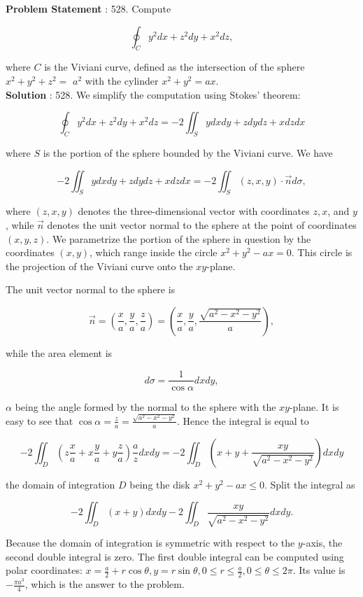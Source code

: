 \documentclass[10pt]{article}
\begin{document}
\textbf{Problem Statement} :
528. Compute

$$
\oint_{C} y^{2} d x+z^{2} d y+x^{2} d z,
$$

where $C$ is the Viviani curve, defined as the intersection of the sphere $x^{2}+y^{2}+z^{2}=$ $a^{2}$ with the cylinder $x^{2}+y^{2}=a x$.
\\
\textbf{Solution} :
528. We simplify the computation using Stokes' theorem:

$$
\oint_{C} y^{2} d x+z^{2} d y+x^{2} d z=-2 \iint_{S} y d x d y+z d y d z+x d z d x
$$

where $S$ is the portion of the sphere bounded by the Viviani curve. We have

$$
-2 \iint_{S} y d x d y+z d y d z+x d z d x=-2 \iint_{S}(z, x, y) \cdot \vec{n} d \sigma,
$$

where $(z, x, y)$ denotes the three-dimensional vector with coordinates $z, x$, and $y$, while $\vec{n}$ denotes the unit vector normal to the sphere at the point of coordinates $(x, y, z)$. We parametrize the portion of the sphere in question by the coordinates $(x, y)$, which range inside the circle $x^{2}+y^{2}-a x=0$. This circle is the projection of the Viviani curve onto the $x y$-plane.

The unit vector normal to the sphere is

$$
\vec{n}=\left(\frac{x}{a}, \frac{y}{a}, \frac{z}{a}\right)=\left(\frac{x}{a}, \frac{y}{a}, \frac{\sqrt{a^{2}-x^{2}-y^{2}}}{a}\right),
$$

while the area element is

$$
d \sigma=\frac{1}{\cos \alpha} d x d y,
$$

$\alpha$ being the angle formed by the normal to the sphere with the $x y$-plane. It is easy to see that $\cos \alpha=\frac{z}{a}=\frac{\sqrt{a^{2}-x^{2}-y^{2}}}{a}$. Hence the integral is equal to

$$
-2 \iint_{D}\left(z \frac{x}{a}+x \frac{y}{a}+y \frac{z}{a}\right) \frac{a}{z} d x d y=-2 \iint_{D}\left(x+y+\frac{x y}{\sqrt{a^{2}-x^{2}-y^{2}}}\right) d x d y
$$

the domain of integration $D$ being the disk $x^{2}+y^{2}-a x \leq 0$. Split the integral as

$$
-2 \iint_{D}(x+y) d x d y-2 \iint_{D} \frac{x y}{\sqrt{a^{2}-x^{2}-y^{2}}} d x d y .
$$

Because the domain of integration is symmetric with respect to the $y$-axis, the second double integral is zero. The first double integral can be computed using polar coordinates: $x=\frac{a}{2}+r \cos \theta, y=r \sin \theta, 0 \leq r \leq \frac{a}{2}, 0 \leq \theta \leq 2 \pi$. Its value is $-\frac{\pi a^{3}}{4}$, which is the answer to the problem.
\end{document}
